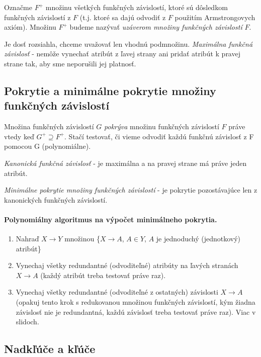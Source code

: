 \documentclass[10pt,a4paper]{article}
\begin{document}
Označme $F^+$ množinu všetkých funkčných závislostí,
ktoré sú dôsledkom funkčných závislostí z $F$ (t.j. ktoré sa dajú
odvodiť z $F$ použitím Armstrongovych axióm). Množinu $F^+$ budeme
nazývať \emph{uzáverom množiny funkčných závislostí} $F$.

Je dosť rozsiahla, chceme uvažovať len vhodnú podmnožinu.
\emph{Maximálna funkčná závislosť} - nemôže vynechať atribút z ľavej strany ani pridať atribút k pravej strane tak, aby sme neporušili jej platnosť.

\subsection{Pokrytie a minimálne pokrytie množiny funkčných závislostí}
Množina funkčných závislostí $G$ \emph{pokrýva} množinu funkčných závislostí $F$ práve vtedy keď $G^+ \supseteq F^+$.
Stačí testovať, či vieme odvodiť každú funkčnú závislosť z F pomocou G (polynomiálne).

\emph{Kanonická funkčná závislosť} - je maximálna a na pravej strane má práve jeden atribút.

\emph{Minimálne pokrytie množiny funkčných závislostí} - je pokrytie pozostávajúce len z kanonických funkčných závislostí.

\paragraph{Polynomiálny algoritmus na výpočet minimálneho pokrytia.}
\begin{enumerate}
\item Nahraď $X \rightarrow Y$ množinou \{$X \rightarrow A$, $A \in Y$, $A$ je jednoduchý (jednotkový) atribút\}
\item Vynechaj všetky redundantné (odvoditeľné) atribúty na ľavých stranách
$X \rightarrow A$ (každý atribút treba testovať práve raz).
\item Vynechaj všetky redundantné (odvoditeľné z ostatných) závislosti $X \rightarrow A$ (opakuj tento
krok s redukovanou množinou funkčných závislostí, kým
žiadna závislosť nie je redundantná, každú závislosť treba
testovať práve raz). Viac v slidoch.

\end{enumerate}

\subsection{Nadkľúče a kľúče}
\end{document}
